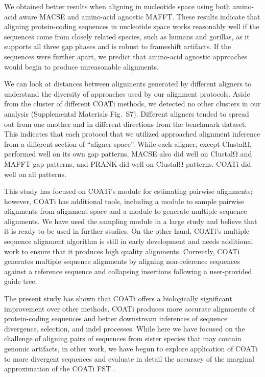 \documentclass[12pt,letterpaper]{article}
\begin{document}
We obtained better results when aligning in nucleotide space using both amino-acid aware MACSE and amino-acid agnostic MAFFT. These results indicate that aligning protein-coding sequences in nucleotide space works reasonably well if the sequences come from closely related species, such as humans and gorillas, as it supports all three gap phases and is robust to frameshift artifacts. If the sequences were further apart, we predict that amino-acid agnostic approaches would begin to produce unreasonable alignments. 

We can look at distances between alignments generated by different aligners to understand the diversity of approaches used by our alignment protocols. Aside from the cluster of different COATi methods, we detected no other clusters in our analysis (Supplemental Materials Fig.~S7). Different aligners tended to spread out from one another and in different directions from the benchmark dataset. This indicates that each protocol that we utilized approached alignment inference from a different section of ``aligner space''. While each aligner, except ClustalΩ, performed well on its own gap patterns, MACSE also did well on ClustalΩ and MAFFT gap patterns, and PRANK did well on ClustalΩ patterns. COATi did well on all patterns.

This study has focused on COATi's module for estimating pairwise alignments; however, COATi has additional tools, including a module to sample pairwise alignments from alignment space and a module to generate multiple-sequence alignments. We have used the sampling module in a large study \citep{zhu2022profiling} and believe that it is ready to be used in further studies. On the other hand, COATi's multiple-sequence alignment algorithm is still in early development and needs additional work to ensure that it produces high quality alignments. Currently, COATi generates multiple sequence alignments by aligning non-reference sequences against a reference sequence and collapsing insertions following a user-provided guide tree.

The present study has shown that COATi offers a biologically significant improvement over other methods. COATi produces more accurate alignments of protein-coding sequences and better downstream inferences of sequence divergence, selection, and indel processes. While here we have focused on the challenge of aligning pairs of sequences from sister species that may contain genomic artifacts, in other work, we have begun to explore application of COATi to more divergent sequences and evaluate in detail the accuracy of the marginal approximation of the COATi FST \citep{garcia2023dissertation}.
\end{document}
